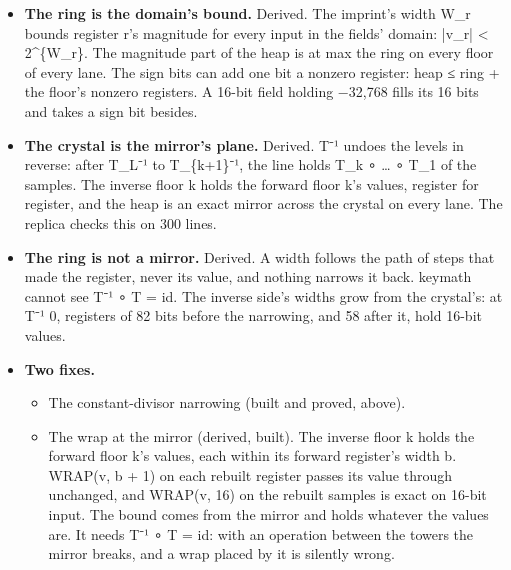 \begin{itemize}
\begin{itemize}
\item The heap pinches at the crystal by 12× for the ramp, 3.2× at ±8 and 1.3× at ±1,024, and not at all for noise.
\item The live bits peak at the last cut (5,079), not at the crystal (1,656).
\item 128 samples at 7 levels are refused: 93-bit registers overflow the 256-limb file.
\end{itemize}
\item \textbf{The ring is the domain's bound.} Derived. The imprint's width W\_\allowbreak{}r bounds register r's magnitude for every input in the fields' domain: |v\_\allowbreak{}r| < 2\textasciicircum{}\{W\_\allowbreak{}r\}. The magnitude part of the heap is at max the ring on every floor of every lane. The sign bits can add one bit a nonzero register: heap ≤ ring + the floor's nonzero registers. A 16-bit field holding −32,768 fills its 16 bits and takes a sign bit besides.
\item \textbf{The crystal is the mirror's plane.} Derived. T⁻¹ undoes the levels in reverse: after T\_\allowbreak{}L⁻¹ to T\_\allowbreak{}\{k+1\}⁻¹, the line holds T\_\allowbreak{}k ∘ … ∘ T\_\allowbreak{}1 of the samples. The inverse floor k holds the forward floor k's values, register for register, and the heap is an exact mirror across the crystal on every lane. The replica checks this on 300 lines.
\item \textbf{The ring is not a mirror.} Derived. A width follows the path of steps that made the register, never its value, and nothing narrows it back. keymath cannot see T⁻¹ ∘ T = id. The inverse side's widths grow from the crystal's: at T⁻¹ 0, registers of 82 bits before the narrowing, and 58 after it, hold 16-bit values.
\item \textbf{Two fixes.}

\begin{itemize}
\item The constant-divisor narrowing (built and proved, above).
\item The wrap at the mirror (derived, built). The inverse floor k holds the forward floor k's values, each within its forward register's width b. WRAP(v, b + 1) on each rebuilt register passes its value through unchanged, and WRAP(v, 16) on the rebuilt samples is exact on 16-bit input. The bound comes from the mirror and holds whatever the values are. It needs T⁻¹ ∘ T = id: with an operation between the towers the mirror breaks, and a wrap placed by it is silently wrong.


\end{itemize}
\end{itemize}
